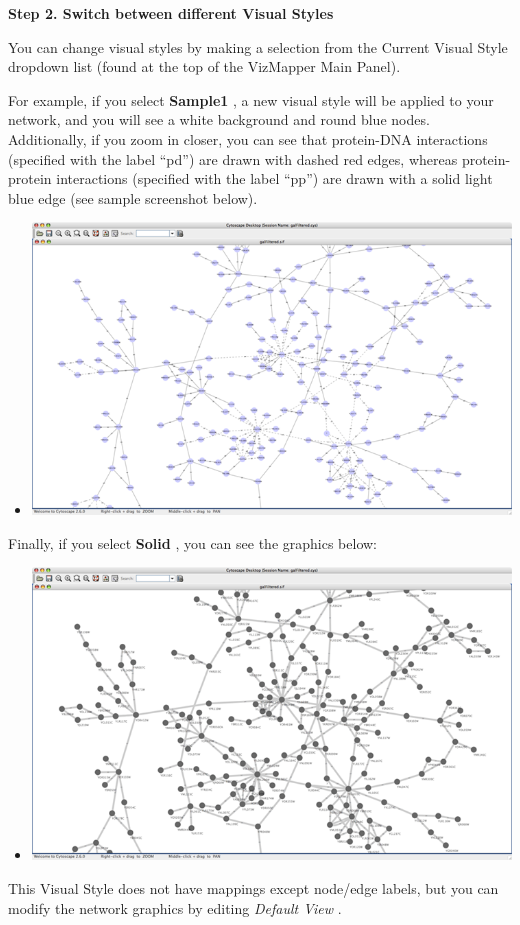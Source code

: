  \textbf{Step 2. Switch between different Visual Styles}



 You can change visual styles by making a selection from the Current Visual Style dropdown list (found at the top of the VizMapper Main Panel). 


 For example, if you select \textbf{Sample1}
, a new visual style will be applied to your network, and you will see a white background and round blue nodes. Additionally, if you zoom in closer, you can see that protein-DNA interactions (specified with the label ``pd'') are drawn with dashed red edges, whereas protein-protein interactions (specified with the label ``pp'') are drawn with a solid light blue edge (see sample screenshot below). 
\begin{itemize}
\item 

 \includegraphics[width=.6\textwidth]{images/VizMapperSample1Style26.png} 


\end{itemize}


 Finally, if you select \textbf{Solid}
, you can see the graphics below: 
\begin{itemize}
\item 

 \includegraphics[width=.6\textwidth]{images/VizMapperSolidStyle.png} 


\end{itemize}


 This Visual Style does not have mappings except node/edge labels, but you can modify the network graphics by editing \emph{Default View}
. 


